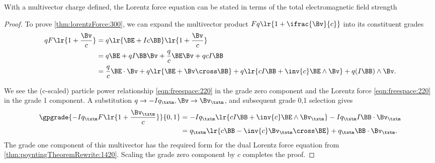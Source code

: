 With a multivector charge defined, the Lorentz force equation can be stated in terms of the total electromagnetic field strength

\begin{proof}
To prove
\cref{thm:lorentzForce:300},
we can expand the multivector product
\( F q \lr{ 1 + \ifrac{\Bv}{c} } \) into its constituent grades
\begin{equation}\label{eqn:lorentzForce:40}
\begin{aligned}
q F \lr{ 1 + \frac{\Bv}{c} }
&=
q
\lr{ \BE + I c \BB }
\lr{ 1 + \frac{\Bv}{c} } \\
&=
q \BE
+ q I \BB \Bv
+ \frac{q}{c} \BE \Bv
+ q c I \BB \\
&=
  \frac{q}{c} \BE \cdot \Bv
+ q \lr{ \BE + \Bv \cross \BB }
+ q \lr{ c I \BB + \inv{c} \BE \wedge \Bv }
+ q (I \BB) \wedge \Bv.
\end{aligned}
\end{equation}

We see the (c-scaled) particle power relationship
\cref{eqn:freespace:220}
in the grade zero component and the Lorentz force \cref{eqn:freespace:220} in the grade 1 component.
A substitution \( q \rightarrow -I q_\txtm, \Bv \rightarrow \Bv_\txtm \), and subsequent grade 0,1 selection gives
\begin{equation}\label{eqn:lorentzForce:320}
\begin{aligned}
\gpgrade{
-I q_\txtm F \lr{ 1 + \frac{\Bv_\txtm}{c} }
}{0,1}
&=
- I q_\txtm \lr{ c I \BB + \inv{c} \BE \wedge \Bv_\txtm }
- I q_\txtm I \BB \cdot \Bv_\txtm \\
&=
q_\txtm \lr{ c \BB - \inv{c} \Bv_\txtm \cross \BE }
+
q_\txtm \BB \cdot \Bv_\txtm.
\end{aligned}
\end{equation}
The grade one component of this multivector has the
required form for the dual Lorentz force equation
from \cref{thm:poyntingTheoremRewrite:1420}.
Scaling the grade zero component by \( c \) completes the proof.
\end{proof}


